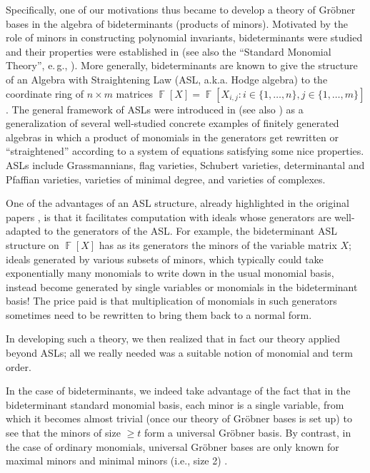 \documentclass[11pt,reqno]{amsart}
\DeclareMathOperator{\F}{\mathbb{F}}
\newcommand{\gb}{Gr\"{o}bner }
\theoremstyle{definition}
\numberwithin{equation}{section}
\begin{document}
Specifically, one of our motivations thus became to develop a theory of \gb bases in the algebra of bideterminants (products of minors). Motivated by the role of minors in constructing polynomial invariants, bideterminants were studied and their properties were established in \cite{doubilet1974foundations, deconciniprocesi1976characteristic, DEPYoung, desarmenien1982invariant} (see also the ``Standard Monomial Theory'', e.\,g., \cite{SMT1, SMT2}). More generally, bideterminants are known to give the structure of an Algebra with Straightening Law (ASL, a.k.a. Hodge algebra) to the coordinate ring of $n \times m$ matrices $\F[X] = \F[X_{i,j} : i\in \{1,\dotsc,n\}, j \in \{1,\dotsc,m\}]$. The general framework of ASLs were introduced in \cite{deconcini1987hodge} (see also \cite{eisenbud-intro-1980}) as a generalization of several well-studied concrete examples of finitely generated algebras in which a product of monomials in the generators get rewritten or ``straightened'' according to a system of equations satisfying some nice properties. ASLs include Grassmannians, flag varieties, Schubert varieties, determinantal and Pfaffian varieties, varieties of minimal degree, and varieties of complexes.

One of the advantages of an ASL structure, already highlighted in the original papers \cite{deconcini1987hodge, eisenbud-intro-1980}, is that it facilitates computation with ideals whose generators are well-adapted to the generators of the ASL. For example, the bideterminant ASL structure on $\F[X]$ has as its generators the minors of the variable matrix $X$; ideals generated by various subsets of minors, which typically could take exponentially many monomials to write down in the usual monomial basis, instead become generated by single variables or monomials in the bideterminant basis! The price paid is that multiplication of monomials in such generators sometimes need to be rewritten to bring them back to a normal form. 

In developing such a theory, we then realized that in fact our theory applied beyond ASLs; all we really needed was a suitable notion of monomial and term order.

In the case of bideterminants, we indeed take advantage of the fact that in the bideterminant standard monomial basis, each minor is a single variable, from which it becomes almost trivial (once our theory of Gröbner bases is set up) to see that the minors of size $\geq t$ form a universal Gröbner basis. By contrast, in the case of ordinary monomials, universal Gröbner bases are only known for maximal minors \cite{sturmfels-maximal-1993,bernstein1993combinatorics} and minimal minors (i.e., size 2) \cite{sturmfels1996grobner}.
\end{document}
